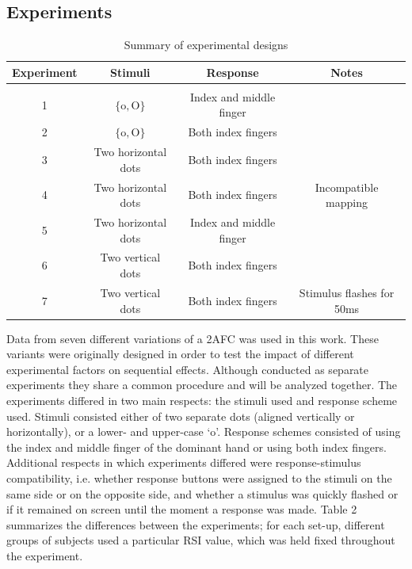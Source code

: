 \documentclass{apa}[12pt]
\begin{document}
\subsection{Experiments}

\begin{table}[t]
\centering
\caption[Summary of experimental designs]{Summary of experimental designs}
\label{table_experiments}

\begin{tabular}{cccc}
Experiment & Stimuli & Response & Notes
\\ \hline \\
1   & $\lbrace \text{o},\text{O}\rbrace$ & Index and middle finger &\\
2   & $\lbrace \text{o},\text{O}\rbrace$ & Both index fingers &\\
3   & Two horizontal dots & Both index fingers  &\\
4   & Two horizontal dots & Both index fingers & Incompatible mapping\\
5   & Two horizontal dots & Index and middle finger &\\
6   & Two vertical dots & Both index fingers &\\
7	& Two vertical dots & Both index fingers & Stimulus flashes for 50ms\\
\end{tabular}

\end{table}

Data from seven different variations of a 2AFC was used in this work. These variants were originally designed in order to test the impact of different experimental factors on sequential effects. Although conducted as separate experiments they share a common procedure and will be analyzed together.\footnotemark{} The experiments differed in two main respects: the stimuli used and response scheme used. Stimuli consisted either of two separate dots (aligned vertically or horizontally), or a lower- and upper-case `o'. Response schemes consisted of using the index and middle finger of the dominant hand or using both index fingers. Additional respects in which experiments differed were response-stimulus compatibility, i.e. whether response buttons were assigned to the stimuli on the same side or on the opposite side, and whether a stimulus was quickly flashed or if it remained on screen until the moment a response was made. Table 2 summarizes the differences between the experiments; for each set-up, different groups of subjects used a particular RSI value, which was held fixed throughout the experiment.
\end{document}
